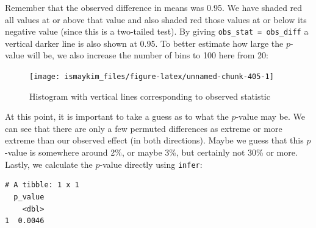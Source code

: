 \documentclass[12pt,]{krantz}
\makeatletter
\newenvironment{Shaded}{\begin{snugshade}}{\end{snugshade}}
\newcommand{\KeywordTok}[1]{\textcolor[rgb]{0.27,0.27,0.27}{\textbf{#1}}}
\newcommand{\DataTypeTok}[1]{\textcolor[rgb]{0.27,0.27,0.27}{#1}}
\newcommand{\DecValTok}[1]{\textcolor[rgb]{0.06,0.06,0.06}{#1}}
\newcommand{\StringTok}[1]{\textcolor[rgb]{0.5,0.5,0.5}{#1}}
\newcommand{\OperatorTok}[1]{\textcolor[rgb]{0.43,0.43,0.43}{\textbf{#1}}}
\newcommand{\NormalTok}[1]{#1}
\newenvironment{kframe}{%
\medskip{}
\setlength{\fboxsep}{.8em}
 \def\at@end@of@kframe{}%
 \ifinner\ifhmode%
  \def\at@end@of@kframe{\end{minipage}}%
  \begin{minipage}{\columnwidth}%
 \fi\fi%
 \def\FrameCommand##1{\hskip\@totalleftmargin \hskip-\fboxsep
 \colorbox{shadecolor}{##1}\hskip-\fboxsep
     \hskip-\linewidth \hskip-\@totalleftmargin \hskip\columnwidth}%
 \MakeFramed {\advance\hsize-\width
   \@totalleftmargin\z@ \linewidth\hsize
   \@setminipage}}%
 {\par\unskip\endMakeFramed%
 \at@end@of@kframe}
\renewenvironment{Shaded}{\begin{kframe}}{\end{kframe}}
\theoremstyle{definition}
\theoremstyle{definition}
\theoremstyle{definition}
\theoremstyle{remark}
\makeatother
\begin{document}
Remember that the observed difference in means was 0.95. We have shaded
red all values at or above that value and also shaded red those values
at or below its negative value (since this is a two-tailed test). By
giving \texttt{obs\_stat\ =\ obs\_diff} a vertical darker line is also
shown at 0.95. To better estimate how large the \(p\)-value will be, we
also increase the number of bins to 100 here from 20:

\begin{Shaded}
\end{Shaded}

\begin{figure}

{\centering \texttt{[image: ismaykim\_files/figure-latex/unnamed-chunk-405-1]} 

}

\caption{Histogram with vertical lines corresponding to observed statistic}\label{fig:unnamed-chunk-405}
\end{figure}

At this point, it is important to take a guess as to what the
\(p\)-value may be. We can see that there are only a few permuted
differences as extreme or more extreme than our observed effect (in both
directions). Maybe we guess that this \(p\)-value is somewhere around
2\%, or maybe 3\%, but certainly not 30\% or more. Lastly, we calculate
the \(p\)-value directly using \texttt{infer}:

\begin{Shaded}
\end{Shaded}

\begin{verbatim}
# A tibble: 1 x 1
  p_value
    <dbl>
1  0.0046
\end{verbatim}
\end{document}
